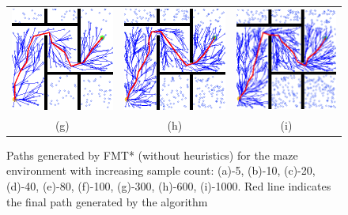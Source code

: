 \documentclass{article}
\begin{document}
\begin{figure}[H]
{\begin{tabular}{ccc}
			\includegraphics[scale=0.3]{fmt_paths/n_samples/6.png} & \includegraphics[scale=0.3]{fmt_paths/n_samples/7.png} & \includegraphics[scale=0.3]{fmt_paths/n_samples/8.png}\\
			(g) & (h) & (i)\\[6pt]
		\end{tabular}
	}
	\caption{Paths generated by FMT* (without heuristics) for the maze environment with increasing sample count: (a)-5, (b)-10, (c)-20, (d)-40, (e)-80, (f)-100, (g)-300, (h)-600, (i)-1000. Red line indicates the final path generated by the algorithm}
	\label{fmt:nsamples}
\end{figure}
\end{document}
